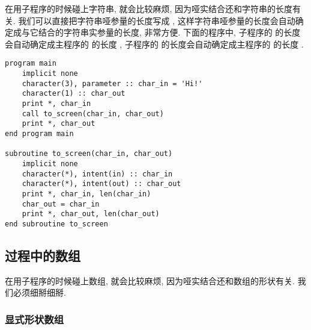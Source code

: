在用子程序的时候碰上字符串, 就会比较麻烦, 因为哑实结合还和字符串的长度有关. 我们可以直接把字符串哑参量的长度写成 \ttt{*}, 这样字符串哑参量的长度会自动确定成与它结合的字符串实参量的长度, 非常方便. 下面的程序中, 子程序的  的长度会自动确定成主程序的  的长度 , 子程序的  的长度会自动确定成主程序的  的长度 .
\begin{lstlisting}
program main
    implicit none
    character(3), parameter :: char_in = 'Hi!'
    character(1) :: char_out
    print *, char_in
    call to_screen(char_in, char_out)
    print *, char_out
end program main

subroutine to_screen(char_in, char_out)
    implicit none
    character(*), intent(in) :: char_in
    character(*), intent(out) :: char_out
    print *, char_in, len(char_in)
    char_out = char_in
    print *, char_out, len(char_out)
end subroutine to_screen
\end{lstlisting}

\subsection{过程中的数组} 

在用子程序的时候碰上数组, 就会比较麻烦, 因为哑实结合还和数组的形状有关. 我们必须细掰细掰. 

\subsubsection{显式形状数组} 

